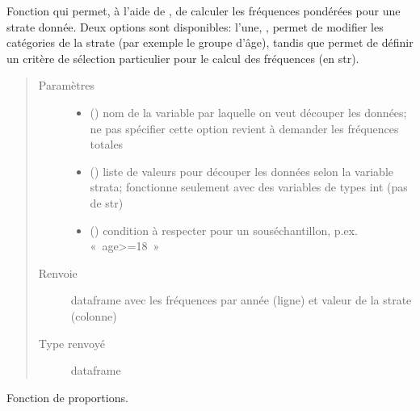\documentclass[letterpaper,10pt,french]{sphinxmanual}
\begin{document}
\begin{fulllineitems}
\begin{fulllineitems}
Fonction qui permet, à l’aide de , de calculer les fréquences pondérées pour une strate donnée. Deux options sont disponibles: l’une, , permet de modifier les catégories de la strate (par exemple le groupe d’âge), tandis que  permet de définir un critère de sélection particulier pour le calcul des fréquences (en str).
\begin{quote}\begin{description}
\item[{Paramètres}] \leavevmode\begin{itemize}
\item {} 
 () \textendash{} nom de la variable par laquelle on veut découper les données; ne pas spécifier cette option revient à demander les fréquences totales

\item {} 
 () \textendash{} liste de valeurs pour découper les données selon la variable strata; fonctionne seulement avec des variables de types int (pas de str)

\item {} 
 () \textendash{} condition à respecter pour un sous\sphinxhyphen{}échantillon, p.ex. « age\textgreater{}=18 »

\end{itemize}

\item[{Renvoie}] \leavevmode
dataframe avec les fréquences par année (ligne) et valeur de la strate (colonne)

\item[{Type renvoyé}] \leavevmode
dataframe

\end{description}\end{quote}

\end{fulllineitems}


\begin{fulllineitems}
\label{\detokenize{code:simgen.statistics.prop}}
Fonction de proportions.


\end{fulllineitems}
\end{fulllineitems}
\end{document}
